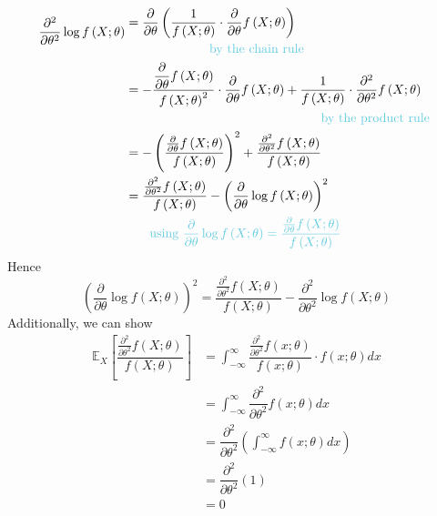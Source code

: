 \documentclass[11pt]{report} %
\begin{document}
\begin{align}
\dfrac{\partial^{2}}{\partial \theta^{2}}\log f\left(X;\theta\right) & \begin{multlined}=\dfrac{\partial}{\partial \theta}\left(\dfrac{1}{f\left(X;\theta\right)}\cdot\dfrac{\partial}{\partial \theta}f\left(X;\theta\right)\right) \\
\text{\blue by the chain rule \black} \end{multlined} \\
& \begin{multlined}= -\dfrac{\dfrac{\partial}{\partial \theta}f\left(X;\theta\right)}{f\left(X;\theta\right)^{2}}\cdot\dfrac{\partial}{\partial \theta}f\left(X;\theta\right) + \dfrac{1}{f\left(X;\theta\right)}\cdot \dfrac{\partial^{2}}{\partial \theta^{2}}f\left(X;\theta\right) \\
\text{\blue by the product rule \black} \end{multlined} \\
&= -\left(\dfrac{\frac{\partial}{\partial \theta}f\left(X;\theta\right)}{f\left(X;\theta\right)}\right)^{2} + \dfrac{\frac{\partial^{2}}{\partial \theta^{2}}f\left(X;\theta\right)}{f\left(X;\theta\right)} \\
& \begin{multlined}= \dfrac{\frac{\partial^{2}}{\partial \theta^{2}}f\left(X;\theta\right)}{f\left(X;\theta\right)} - \left(\dfrac{\partial}{\partial \theta}\log f\left(X;\theta\right)\right)^{2} \\
\text{\blue using }\blue\dfrac{\partial}{\partial \theta}\log f\left(X;\theta\right) = \dfrac{\frac{\partial}{\partial \theta}f\left(X;\theta\right)}{f\left(X;\theta\right)}\black
\end{multlined}
\end{align}
Hence
\begin{equation}
\left(\dfrac{\partial}{\partial \theta}\log f\left(X;\theta\right)\right)^{2} = \dfrac{\frac{\partial^{2}}{\partial \theta^{2}}f\left(X;\theta\right)}{f\left(X;\theta\right)} - \dfrac{\partial^{2}}{\partial \theta^{2}}\log f\left(X;\theta\right)
\end{equation}
Additionally, we can show
\begin{align}
\mathbb{E}_{X}\left[\dfrac{\frac{\partial^{2}}{\partial \theta^{2}}f\left(X;\theta\right)}{f\left(X;\theta\right)}\right] &= \int_{-\infty}^{\infty}\dfrac{\frac{\partial^{2}}{\partial \theta^{2}}f\left(x;\theta\right)}{f\left(x;\theta\right)}\cdot f\left(x; \theta\right) dx \\
&= \int_{-\infty}^{\infty}\dfrac{\partial^{2}}{\partial \theta^{2}}f\left(x;\theta\right) dx \\
&= \dfrac{\partial^{2}}{\partial \theta^{2}}\left(\int_{-\infty}^{\infty}f\left(x;\theta\right) dx\right) \\
&= \dfrac{\partial^{2}}{\partial \theta^{2}}\left(1\right) \\
&= 0
\end{align}
\end{document}
